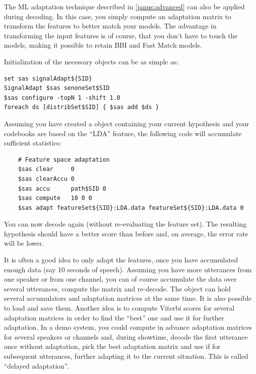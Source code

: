 The ML adaptation technique described in \ref{janus:advanced} can also
be   applied  during decoding. In  this   case, you  simply compute an
adaptation  matrix  to transform the  features   to better match  your
models. The advantage in transforming the input features is of course,
that you don't have to touch the models, making  it possible to retain
BBI and Fast Match models.

Initialization of the necessary objects can be as simple as:

\begin{verbatim}
set sas signalAdapt${SID}
SignalAdapt $sas senoneSet$SID
$sas configure -topN 1 -shift 1.0
foreach ds [distribSet$SID] { $sas add $ds }
\end{verbatim}

Assuming you have created a  object containing your
current  hypothesis  and  your  codebooks  are  based  on the  ``LDA''
feature, the following code will accumulate sufficient statistics:

\begin{verbatim}
    # Feature space adaptation
    $sas clear     0
    $sas clearAccu 0
    $sas accu      path$SID 0
    $sas compute   10 0 0
    $sas adapt featureSet${SID}:LDA.data featureSet${SID}:LDA.data 0
\end{verbatim}

You can now decode again (without re-evaluating  the feature set). The
resulting  hypothesis should have a better   score than before and, on
average, the error rate will be lower.

It  is often a good idea   to only adapt the  features,  once you have
accumulated enough data (say 10 seconds of  speech). Assuming you have
more  utterances from  one  speaker or from  one  channel,  you can of
course accumulate the data over several utterances, compute the matrix
and re-decode. The   object can hold several
accumulators and  adaptation matrices  at the  same time.  It  is also
possible  to load and  save them.  Another idea is  to compute Viterbi
scores for several  adaptation matrices in order  to find the ``best''
one  and use it  for further adaptation. In   a demo system, you could
compute  in  advance  adaptation   matrices  for several   speakers or
channels and, during showtime, decode the first utterance once without
adaptation, pick the best adaptation matrix and  use if for subsequent
utterances, further adapting it to the current situation. This is
called ``delayed adaptation''.

